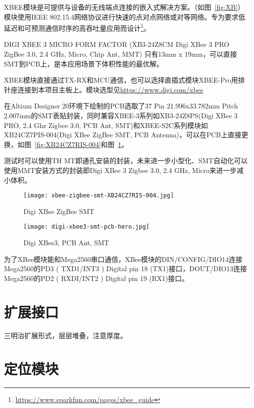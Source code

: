 XBEE模块是可提供与设备的无线端点连接的嵌入式解决方案。（如图~\ref{fig:XB}）模块使用IEEE 802.15.4网络协议进行快速的点对点网络或对等网络。专为要求低延迟和可预测通信时序的高吞吐量应用而设计\footnote{\url{https://www.sparkfun.com/pages/xbee_guide}}。

DIGI XBEE 3 MICRO FORM FACTOR (XB3-24Z8CM  Digi XBee 3 PRO ZigBee 3.0, 2.4 GHz, Micro, Chip Ant, MMT) 只有13mm x 19mm，可以直接SMT到PCB上，是本应用场景下体积性能的最优解。

XBEE模块直接通过TX-RX和MCU通信，也可以选择直插式模块XBEE-Pro用排针座连接到本项目主板上。模块选型见\url{https://www.digi.com/xbee}

在Altium Designer 20环境下绘制的PCB选取了37 Pin 21.996x33.782mm Pitch 2.007mm的SMT表贴封装，同时兼容XBEE-3系列如XB3-24Z8PS(Digi XBee 3 PRO, 2.4 Ghz Zigbee 3.0, PCB Ant, SMT)和XBEE-S2C系列模块如XB24CZ7PIS-004(Digi XBee ZigBee SMT, PCB Antenna)，可以在PCB上直接更换，如图~\ref{fig:XB24CZ7RIS-004}和图~\ref{fig:xbee3}。

测试时可以使用TH MT即通孔安装的封装，未来进一步小型化、SMT自动化可以使用MMT安装方式的封装即Digi XBee 3 Zigbee 3.0, 2.4 GHz, Micro来进一步减小体积。

\begin{figure}
    \begin{minipage}{0.48\textwidth}
      \centering
      \texttt{[image: xbee-zigbee-smt-XB24CZ7RIS-004.jpg]}
      \caption{Digi XBee ZigBee SMT}
      \label{fig:XB24CZ7RIS-004}
    \end{minipage}\hfill
    \begin{minipage}{0.48\textwidth}
      \centering
      \texttt{[image: digi-xbee3-smt-pcb-hero.jpg]}
      \caption{Digi XBee3, PCB Ant, SMT}
      \label{fig:xbee3}
    \end{minipage}
\end{figure}

为了XBee模块能和Mega2560串口通信，XBee模块的DIN/CONFIG/DIO14连接Mega2560的PD3 ( TXD1/INT3 ) Digital pin 18 (TX1)接口，DOUT/DIO13连接Mega2560的PD2 ( RXDI/INT2 ) Digital pin 19 (RX1)接口。

\section{扩展接口}

三明治扩展形式，层层堆叠，注意厚度。

\section{定位模块}

